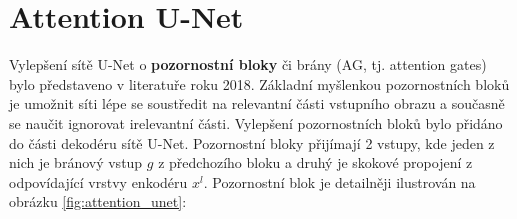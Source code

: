 \section{Attention U-Net}
\label{sec:Chapter24}

Vylepšení sítě U-Net o \textbf{pozornostní bloky} či brány (AG, tj. attention gates) bylo představeno v literatuře \cite{attentionunet} roku 2018. Základní myšlenkou pozornostních bloků je umožnit síti lépe se soustředit na relevantní části vstupního obrazu a současně se naučit ignorovat irelevantní části. Vylepšení pozornostních bloků bylo přidáno do části dekodéru sítě U-Net. Pozornostní bloky přijímají 2 vstupy, kde jeden z nich je bránový vstup $g$ z předchozího bloku a druhý je skokové propojení z odpovídající vrstvy enkodéru $x^l$. Pozornostní blok je detailněji ilustrován na obrázku \ref{fig:attention_unet}:

